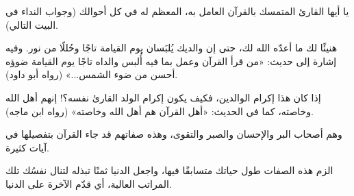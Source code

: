 \begin{mufradat}
\end{mufradat}
\maana يا أيها القارئ المتمسك بالقرآن العامل به، المعظم له في كل أحوالك (وجواب النداء في البيت التالي).

\begin{mufradat}
\end{mufradat}
\maana هنيئًا لك ما أعدّه الله لك، حتى إن والديك يُلبَسان يوم القيامة تاجًا وحُللًا من نور. وفيه إشارة إلى حديث: «من قرأ القرآن وعمل بما فيه أُلبس والداه تاجًا يوم القيامة ضوؤه أحسن من ضوء الشمس...» (رواه أبو داود).

\begin{mufradat}
\end{mufradat}
\maana إذا كان هذا إكرام الوالدين، فكيف يكون إكرام الولد القارئ نفسه؟! إنهم أهل الله وخاصته، كما في الحديث: «أهل القرآن هم أهل الله وخاصته» (رواه ابن ماجه).

\begin{mufradat}
\end{mufradat}
\maana وهم أصحاب البر والإحسان والصبر والتقوى، وهذه صفاتهم قد جاء القرآن بتفصيلها في آيات كثيرة.

\begin{mufradat}
\end{mufradat}
\maana الزم هذه الصفات طول حياتك متسابقًا فيها، واجعل الدنيا ثمنًا تبذله لتنال نفسُك تلك المراتب العالية، أي قدّم الآخرة على الدنيا.
